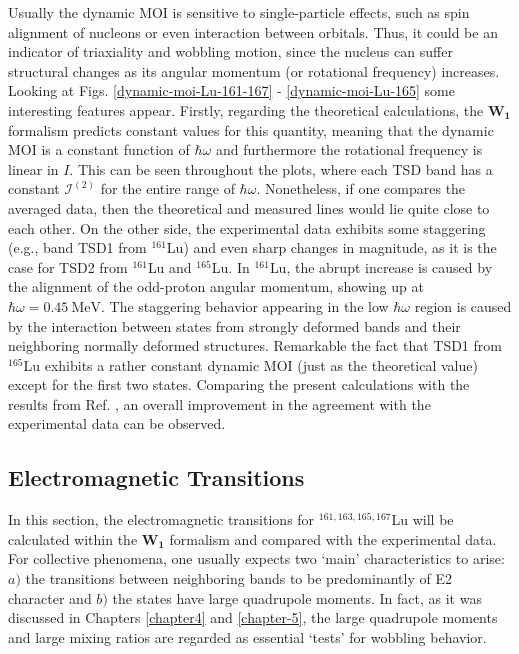 Usually the dynamic MOI is sensitive to single-particle effects, such as spin alignment of nucleons or even interaction between orbitals. Thus, it could be an indicator of triaxiality and wobbling motion, since the nucleus can suffer structural changes as its angular momentum (or rotational frequency) increases. Looking at Figs. \ref{dynamic-moi-Lu-161-167} - \ref{dynamic-moi-Lu-165} some interesting features appear. Firstly, regarding the theoretical calculations, the $\mathbf{W_1}$ formalism predicts constant values for this quantity, meaning that the dynamic MOI is a constant function of $\hbar\omega$ and furthermore the rotational frequency is linear in $I$. This can be seen throughout the plots, where each TSD band has a constant $\mathcal{I}^{(2)}$ for the entire range of $\hbar\omega$. Nonetheless, if one compares the averaged data, then the theoretical and measured lines would lie quite close to each other. On the other side, the experimental data exhibits some staggering (e.g., band TSD1 from $^{161}$Lu) and even sharp changes in magnitude, as it is the case for TSD2 from $^{161}$Lu and $^{165}$Lu. In $^{161}$Lu, the abrupt increase is caused by the alignment of the odd-proton angular momentum, showing up at $\hbar\omega=0.45\ \text{MeV}$. The staggering behavior appearing in the low $\hbar\omega$ region is caused by the interaction between states from strongly deformed bands and their neighboring normally deformed structures. Remarkable the fact that TSD1 from $^{165}$Lu exhibits a rather constant dynamic MOI (just as the theoretical value) except for the first two states. Comparing the present calculations with the results from Ref. \cite{raduta2018wobbling}, an overall improvement in the agreement with the experimental data can be observed.

\subsection{Electromagnetic Transitions}

In this section, the electromagnetic transitions for $^{161,163,165,167}$Lu will be calculated within the $\mathbf{W_1}$ formalism and compared with the experimental data. For collective phenomena, one usually expects two `main' characteristics to arise: $a)$ the transitions between neighboring bands to be predominantly of E2 character and $b)$ the states have large quadrupole moments. In fact, as it was discussed in Chapters \ref{chapter4} and \ref{chapter-5}, the large quadrupole moments and large mixing ratios are regarded as essential `tests' for wobbling behavior.

